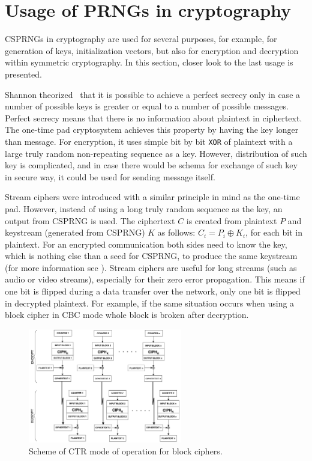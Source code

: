 \documentclass[
    digital,    %
    oneside,    %
    color,
    11pt,
    nocover,
    notable,
    nolof,
    nolot,
    final
]{fithesis3}
\renewcommand\_{\textunderscore\allowbreak}
\begin{document}
\section{Usage of PRNGs in cryptography}

CSPRNGs in cryptography are used for several purposes, for example, for generation of keys, initialization vectors, but also for encryption and decryption within symmetric cryptography. In this section, closer look to the last usage is presented.

Shannon theorized~\cite{perfect-secrecy} that it is possible to achieve a perfect secrecy only in case a number of possible keys is greater or equal to a number of possible messages. Perfect secrecy means that there is no information about plaintext in ciphertext. The one-time pad cryptosystem achieves this property by having the key longer than message. For encryption, it uses simple bit by bit \texttt{XOR} of plaintext with a large truly random non-repeating sequence as a key. However, distribution of such key is complicated, and in case there would be schema for exchange of such key in secure way, it could be used for sending message itself. \cite{schneier1996applied}

Stream ciphers were introduced with a similar principle in mind as the one-time pad. However, instead of using a long truly random sequence as the key, an output from CSPRNG is used. The ciphertext $C$ is created from plaintext $P$ and keystream (generated from CSPRNG) $K$ as follows: $C_{i} = P_{i} \oplus K_{i}$, for each bit in plaintext. For an encrypted communication both sides need to know the key, which is nothing else than a seed for CSPRNG, to produce the same keystream (for more information see \cite{schneier1996applied}). Stream ciphers are useful for long streams (such as audio or video streams), especially for their zero error propagation. This means if one bit is flipped during a data transfer over the network, only one bit is flipped in decrypted plaintext. For example, if the same situation occurs when using a block cipher in CBC mode whole block is broken after decryption.

\begin{figure}[!h]
	\centering
	\includegraphics[width=0.6\textwidth]{./images/pictures/ctr.png}
	\caption{Scheme of CTR mode of operation for block ciphers. \cite{Dworkin:2001:SER:2206247}}
	\label{fig:ctr}
\end{figure}
\end{document}
